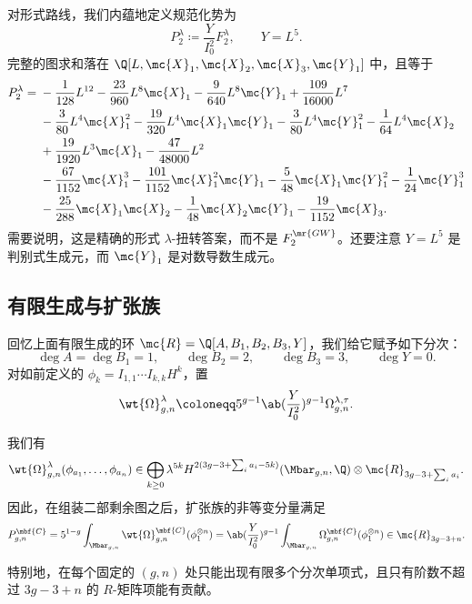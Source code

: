 对形式路线，我们内蕴地定义规范化势为
\[ P_2^{\lambda} \coloneqq \frac{Y}{I_0^2}F_2^{\lambda}, \qquad Y = L^5. \]
完整的图求和落在 \(\Q[L,\mc{X}_1,\mc{X}_2,\mc{X}_3,\mc{Y}_1]\) 中，且等于
\begin{align*}
    P_2^{\lambda} ={}& -\frac{1}{128}L^{12} - \frac{23}{960}L^8\mc{X}_1 - \frac{9}{640}L^8\mc{Y}_1 + \frac{109}{16000}L^7 \\
    &- \frac{3}{80}L^4\mc{X}_1^2 - \frac{19}{320}L^4\mc{X}_1\mc{Y}_1 - \frac{3}{80}L^4\mc{Y}_1^2 - \frac{1}{64}L^4\mc{X}_2 \\
    &+ \frac{19}{1920}L^3\mc{X}_1 - \frac{47}{48000}L^2 \\
    &- \frac{67}{1152}\mc{X}_1^3 - \frac{101}{1152}\mc{X}_1^2\mc{Y}_1 - \frac{5}{48}\mc{X}_1\mc{Y}_1^2 - \frac{1}{24}\mc{Y}_1^3 \\
    &- \frac{25}{288}\mc{X}_1\mc{X}_2 - \frac{1}{48}\mc{X}_2\mc{Y}_1 - \frac{19}{1152}\mc{X}_3.
\end{align*}
需要说明，这是精确的形式 \(\lambda\)-扭转答案，而不是 \(F_2^{\mr{GW}}\)。还要注意 \(Y = L^5\) 是判别式生成元，而 \(\mc{Y}_1\) 是对数导数生成元。

\subsection{有限生成与扩张族}%
\label{sub:Finite generation and the extended family}

回忆上面有限生成的环 \(\mc{R} = \Q[A,B_1,B_2,B_3,Y]\)，我们给它赋予如下分次：
\[ \deg A = \deg B_1 = 1, \qquad \deg B_2 = 2, \qquad \deg B_3 = 3, \qquad \deg Y = 0. \]
对如前定义的 \(\phi_k = I_{1,1}\cdots I_{k,k}H^k\)，置
\[ \wt{\Omega}^{\lambda}_{g,n} \coloneqq 5^{g-1}\ab(\frac{Y}{I_0^2})^{g-1}\Omega^{\lambda,\tau}_{g,n}. \]

\begin{thm}%
\label{thm:graded finite generation}
    我们有
    \[ \wt{\Omega}^{\lambda}_{g,n}(\phi_{a_1}, \ldots, \phi_{a_n}) \in \bigoplus_{k \geq 0}\lambda^{5k}H^{2(3g-3+\sum_i a_i - 5k)}(\Mbar_{g,n},\Q)\otimes \mc{R}_{3g-3+\sum_i a_i}. \]
    因此，在组装二部剩余图之后，扩张族的非等变分量满足
    \[ P^{\mbf{C}}_{g,n} = 5^{1-g}\int_{\Mbar_{g,n}}\wt{\Omega}^{\mbf{C}}_{g,n}(\phi_1^{\otimes n}) = \ab( \frac{Y}{I_0^2})^{g-1}\int_{\Mbar_{g,n}}\Omega^{\mbf{C}}_{g,n}(\phi_1^{\otimes n}) \in \mc{R}_{3g-3+n}. \]
\end{thm}

特别地，在每个固定的 \((g,n)\) 处只能出现有限多个分次单项式，且只有阶数不超过 \(3g-3+n\) 的 \(R\)-矩阵项能有贡献。

